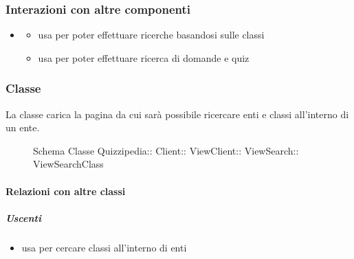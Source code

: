 \subsubsection{Interazioni con altre componenti}
\begin{itemize}
\item {}
\begin{itemize}
\item usa  per poter effettuare ricerche basandosi sulle classi
\item usa  per poter effettuare ricerca di domande e quiz
\end{itemize}
\end{itemize}
\subsubsection{Classe }
La classe carica la pagina da cui sarà possibile ricercare enti e classi all'interno di un ente.
\begin{figure}[H]
\centering
\noindent{}
\caption[Schema Classe ViewSearchClass]{Schema Classe Quizzipedia:: Client:: ViewClient:: ViewSearch:: ViewSearchClass}
\end{figure}
\paragraph{Relazioni con altre classi}
\subparagraph{Uscenti}
\begin{itemize}
\item usa  per cercare classi all'interno di enti
\end{itemize}

